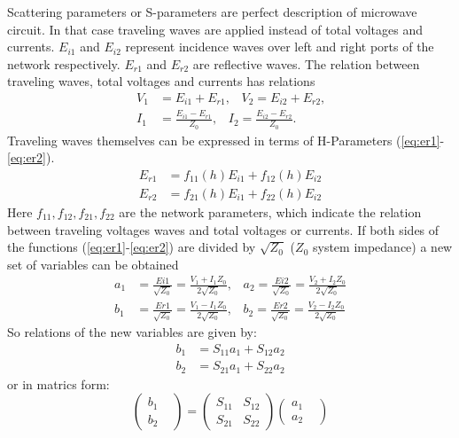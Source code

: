 Scattering parameters or S-parameters are perfect description of microwave circuit\cite{RF194_s_parameters}. In that case traveling waves are applied instead of total voltages and currents. $E_{i1}$ and $E_{i2}$ represent incidence waves over left and right ports of the network respectively. $E_{r1}$ and $E_{r2}$ are reflective waves. The relation between traveling waves, total voltages and currents has relations %
\begin{align}
V_{1}&=E_{i1}+E_{r1}\text{,}\quad V_{2}=E_{i2}+E_{r2}\text{,}
\label{eq:voltage_wave1}\\
I_{1}&=\frac{E_{i1}-E_{r1}}{Z_{0}}\text{,}\quad I_{2}=\frac{E_{i2}-E_{r2}}{Z_{0}}\text{.}
\label{eq:voltage_wave2}
\end{align}
Traveling waves themselves can be expressed in terms of H-Parameters (\ref{eq:er1}-\ref{eq:er2}). 
\begin{align}
E_{r1}&=f_{11}(h)E_{i1}+f_{12}(h)E_{i2}
\label{eq:er1}
\\
E_{r2}&=f_{21}(h)E_{i1}+f_{22}(h)E_{i2}
\label{eq:er2}
\end{align}
Here $f_{11}, f_{12}, f_{21}, f_{22}$ are the network parameters, which indicate the relation between traveling voltages waves and total voltages or currents. If both sides of the functions (\ref{eq:er1}-\ref{eq:er2}) are divided by $\sqrt{Z_{0}}$ ($Z_{0}$ system impedance) a new set of variables can be obtained
\begin{align} 
a_{1}&=\frac{Ei1}{\sqrt{Z_{0}}}=\frac{V_{1}+I_{1}Z_{0}}{2\sqrt{Z_{0}}} \text{,}\quad a_{2}=\frac{Ei2}{\sqrt{Z_{0}}}=\frac{V_{2}+I_{2}Z_{0}}{2\sqrt{Z_{0}}} \\
b_{1}&=\frac{Er1}{\sqrt{Z_{0}}}=\frac{V_{1}-I_{1}Z_{0}}{2\sqrt{Z_{0}}}  \text{,}\quad b_{2}=\frac{Er2}{\sqrt{Z_{0}}}=\frac{V_{2}-I_{2}Z_{0}}{2\sqrt{Z_{0}}}
\end{align}
So relations of the new variables are given by:
\begin{align}
b_{1}&=S_{11}a_{1}+S_{12}a_{2}\\
b_{2}&=S_{21}a_{1}+S_{22}a_{2}
\end{align}
or in matrics form:
\begin{equation}
		\begin{pmatrix}
			b_{1}&\\
			b_{2}&
		\end{pmatrix}
	=	
		\begin{pmatrix}
			S_{11}&S_{12}\\
			S_{21}&S_{22}
		\end{pmatrix}
		\begin{pmatrix}
			a_{1}&\\
			a_{2}&
		\end{pmatrix}
\label{eq:s_matrix}
\end{equation}

